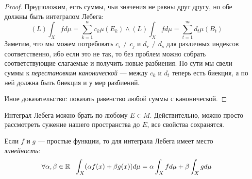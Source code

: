 \begin{proof}
	Предположим, есть суммы, чьи значения не равны друг другу, но обе должны быть интегралом Лебега:
	\[
		(L)\int_X fd\mu = \sum_{k = 1}^n c_k \mu(E_k) \wedge (L)\int_X fd\mu = \sum_{t = 1}^m d_t \mu(B_t)
	\]
	Заметим, что мы можем потребовать $c_i \neq c_j$ и $d_r \neq d_s$ для различных индексов соответственно, ибо если это не так, то без проблем можно собрать соответствующие слагаемые и получить новые разбиения. По сути мы свели суммы к \textit{перестановкам канонической} --- между $c_k$ и $d_t$ теперь есть биекция, а по ней должна быть биекция и у мер разбиений.
	
	Иное доказательство: показать равенство любой суммы с канонической.
\end{proof}

\begin{note}
	Интеграл Лебега можно брать по любому $E \in M$. Действительно, можно просто рассмотреть сужение нашего пространства до $E$, все свойства сохранятся.
\end{note}

\begin{theorem}
	Если $f$ и $g$ --- простые функции, то для интеграла Лебега имеет место \textit{линейность}:
	\[
		\forall \alpha, \beta \in \mathbb{R}\ \ \int_X (\alpha f(x) + \beta g(x))d\mu = \alpha \int_X fd\mu + \beta \int_X gd\mu
	\]
\end{theorem}

